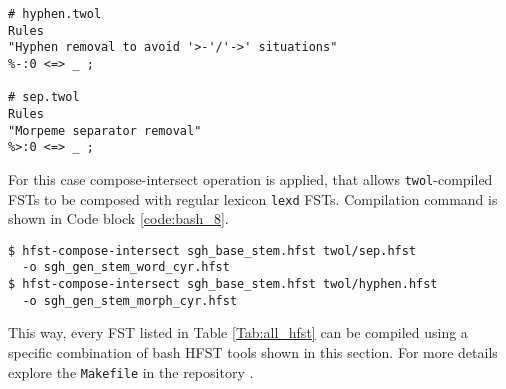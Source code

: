 \begin{code_frame}[float,floatplacement=!h]
    \begin{footnotesize}
    \begin{verbatim}
# hyphen.twol
Rules
"Hyphen removal to avoid '>-'/'->' situations"
%-:0 <=> _ ;

# sep.twol
Rules
"Morpeme separator removal"
%>:0 <=> _ ;
    \end{verbatim}
    \end{footnotesize}
    \tcblower
    \label{code:twol_4_1}
\end{code_frame}

For this case compose-intersect operation is applied, that allows \texttt{twol}-compiled FSTs to be composed with regular lexicon \texttt{lexd} FSTs. Compilation command is shown in Code block \ref{code:bash_8}.

\begin{code_frame}[float,floatplacement=!h]
    \begin{footnotesize}
    \begin{verbatim}
$ hfst-compose-intersect sgh_base_stem.hfst twol/sep.hfst 
  -o sgh_gen_stem_word_cyr.hfst
$ hfst-compose-intersect sgh_base_stem.hfst twol/hyphen.hfst 
  -o sgh_gen_stem_morph_cyr.hfst
    \end{verbatim}
    \end{footnotesize}
    \tcblower
    \label{code:bash_8}
\end{code_frame}

This way, every FST listed in Table \ref{Tab:all_hfst} can be compiled using a specific combination of bash HFST tools shown in this section. For more details explore the \texttt{Makefile} in the repository \parencite{kartina_2025_repo}. 

